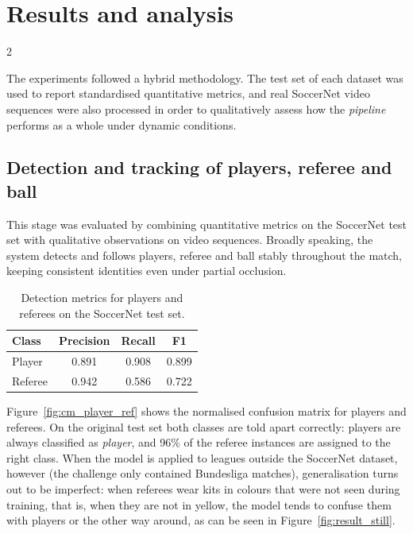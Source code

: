 \section{Results and analysis} \label{section: results}

\begin{multicols}{2}

The experiments followed a hybrid methodology. The test set of each dataset was used to report standardised quantitative metrics, and real SoccerNet video sequences were also processed in order to qualitatively assess how the \textit{pipeline} performs as a whole under dynamic conditions.

\subsection{Detection and tracking of players, referee and ball}

This stage was evaluated by combining quantitative metrics on the SoccerNet test set with qualitative observations on video sequences. Broadly speaking, the system detects and follows players, referee and ball stably throughout the match, keeping consistent identities even under partial occlusion.

\begin{table}[H]
\centering
\caption{Detection metrics for players and referees on the SoccerNet test set.}
\label{tab:metrics_player_ref}
\vspace{0.2cm}
\begin{tabular}{l c c c}
\toprule
\textbf{Class} & \textbf{Precision} & \textbf{Recall} & \textbf{F1} \\
\midrule
Player   & 0.891 & 0.908 & 0.899 \\
Referee  & 0.942 & 0.586 & 0.722 \\
\bottomrule
\end{tabular}
\end{table}

Figure~\ref{fig:cm_player_ref} shows the normalised confusion matrix for players and referees. On the original test set both classes are told apart correctly: players are always classified as \textit{player}, and 96\% of the referee instances are assigned to the right class. When the model is applied to leagues outside the SoccerNet dataset, however (the challenge only contained Bundesliga matches), generalisation turns out to be imperfect: when referees wear kits in colours that were not seen during training, that is, when they are not in yellow, the model tends to confuse them with players or the other way around, as can be seen in Figure~\ref{fig:result_still}.


\end{multicols}
